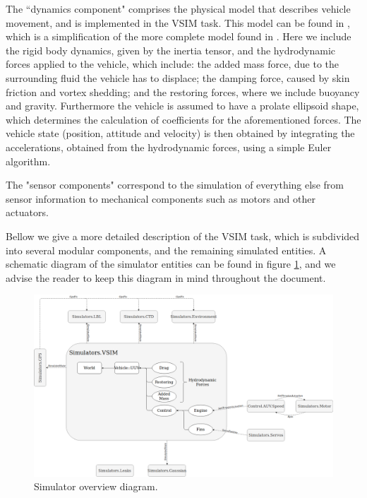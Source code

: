 \documentclass[10pt,a4paper]{article}
\begin{document}
\par The ``dynamics component" comprises the physical model that describes vehicle movement, and is implemented in the VSIM task. This model can be found in \cite{braga}, which is a simplification of the more complete model found in \cite{fossen}. Here we include the rigid body dynamics, given by the inertia tensor, and the hydrodynamic forces applied to the vehicle, which include: the added mass force, due to the surrounding fluid the vehicle has to displace; the damping force, caused by skin friction and vortex shedding; and the restoring forces, where we include buoyancy and gravity. Furthermore the vehicle is assumed to have a prolate ellipsoid shape, which determines the calculation of coefficients for the aforementioned forces. The vehicle state (position, attitude and velocity) is then obtained by integrating the accelerations, obtained from the hydrodynamic forces, using a simple Euler algorithm.

\par The "sensor components" correspond to the simulation of everything else from sensor information to mechanical components such as motors and other actuators.

\par Bellow we give a more detailed description of the VSIM task, which is subdivided into several modular components, and the remaining simulated entities. A schematic diagram of the simulator entities can be found in figure \ref{simulator_overview_diagram}, and we advise the reader to keep this diagram in mind throughout the document.

\begin{figure}[h]
  \centering
  	\includegraphics[width=1.0\textwidth]{figures/Overview_diagram.png}
  \caption{Simulator overview diagram.}
  \label{simulator_overview_diagram}
\end{figure}
\end{document}
